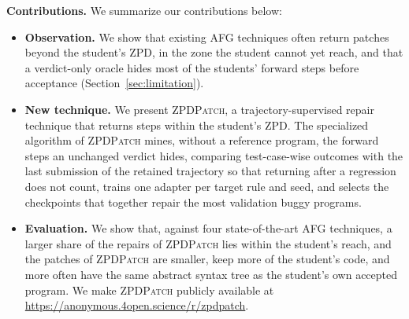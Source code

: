 \documentclass[conference]{IEEEtran}
\begin{document}
\noindent\textbf{Contributions.} We summarize our contributions below:
\begin{itemize}
\item \textbf{Observation.} We show that existing AFG techniques often return patches beyond the student's ZPD, in the zone the student cannot yet reach, and that a verdict-only oracle hides most of the students' forward steps before acceptance (Section~\ref{sec:limitation}).
\item \textbf{New technique.} We present \textsc{ZPDPatch}, a trajectory-supervised repair technique that returns steps within the student's ZPD. The specialized algorithm of \textsc{ZPDPatch} mines, without a reference program, the forward steps an unchanged verdict hides, comparing test-case-wise outcomes with the last submission of the retained trajectory so that returning after a regression does not count, trains one adapter per target rule and seed, and selects the checkpoints that together repair the most validation buggy programs.
\item \textbf{Evaluation.} We show that, against four state-of-the-art AFG techniques, a larger share of the repairs of \textsc{ZPDPatch} lies within the student's reach, and the patches of \textsc{ZPDPatch} are smaller, keep more of the student's code, and more often have the same abstract syntax tree as the student's own accepted program. We make \textsc{ZPDPatch} publicly available at \url{https://anonymous.4open.science/r/zpdpatch}.
\end{itemize}
\end{document}
